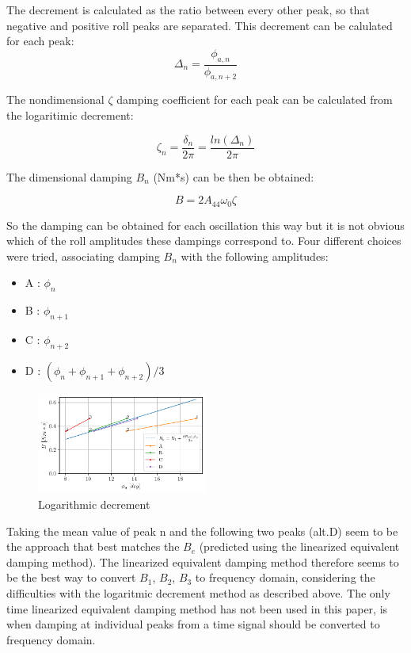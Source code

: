     The decrement is calculated as the ratio between every other peak, so
that negative and positive roll peaks are separated. This decrement can
be calulated for each peak:
\[ \Delta_n = \frac{\phi_{a,n}}{\phi_{a,n+2}}\]

    The nondimensional $\zeta$ damping coefficient for each peak can be
calculated from the logaritimic decrement:

    \[\zeta_n = \frac{\delta_n}{2\pi}=\frac{ln(\Delta_n)}{2\pi}\]

    The dimensional damping $B_n$ (Nm*s) can be then be obtained:
 
            
    
    \begin{equation}
B = 2 A_{44} \omega_{0} \zeta
\label{eq:equation}
\end{equation}

    

    So the damping can be obtained for each oscillation this way but it is
not obvious which of the roll amplitudes these dampings correspond to.
Four different choices were tried, associating damping $B_n$ with the
following amplitudes:

\begin{itemize}
\item A : $\phi_n$
\item B : $\phi_{n+1}$
\item C : $\phi_{n+2}$
\item D : $(\phi_n + \phi_{n+1} + \phi_{n+2})/3$
\end{itemize}

    \begin{figure}[H]
        \begin{center}\includegraphics[width = 0.5\textwidth]{figures/logarithmic_decrement.pdf}\end{center}
        \vspace{-1cm}
        \caption{Logarithmic decrement}
        \label{fig:logarithmic_decrement}
    \end{figure}
    
    Taking the mean value of peak n and the following two peaks (alt.D) seem
to be the approach that best matches the $B_e$ (predicted using the
linearized equivalent damping method). The linearized equivalent damping
method therefore seems to be the best way to convert $B_1$, $B_2$,
$B_3$ to frequency domain, considering the difficulties with the
logaritmic decrement method as described above. The only time linearized
equivalent damping method has not been used in this paper, is when
damping at individual peaks from a time signal should be converted to
frequency domain.

